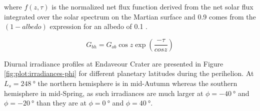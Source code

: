 where $f(z,\tau)$ is the normalized net flux function derived from the net solar flux integrated over the solar spectrum on the Martian surface and 0.9 comes from the $(1-albedo)$ expression for an albedo of 0.1 .

\begin{equation}
  \label{eq:G_bh}
  G_{bh} = G_{ob}\cos{z}\exp(\frac{-\tau}{cos{z}})
\end{equation}

Diurnal irradiance profiles at Endaveour Crater are presented in Figure \ref{fig:plot:irradiances-phi} for different planetary latitudes during the perihelion. At $L_{s} = \SI{248}{\degree}$ the northern hemisphere is in mid-Autumn whereas the southern hemisphere in mid-Spring, as such irradiances are much larger at $\phi = \SI{-40}{\degree}$ and $\phi = \SI{-20}{\degree}$ than they are at $\phi = \SI{0}{\degree}$ and $\phi = \SI{40}{\degree}$.

